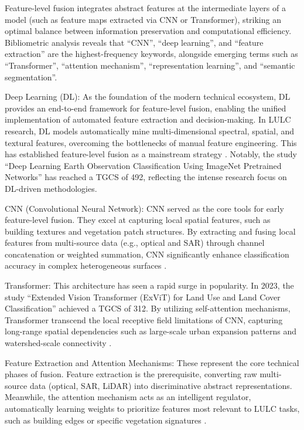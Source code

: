 \documentclass[]{interact}
\theoremstyle{plain}%
\theoremstyle{definition}
\theoremstyle{remark}
\begin{document}
Feature-level fusion integrates abstract features at the intermediate layers of a model (such as feature maps extracted via CNN or Transformer), striking an optimal balance between information preservation and computational efficiency. Bibliometric analysis reveals that ``CNN'', ``deep learning'', and ``feature extraction'' are the highest-frequency keywords, alongside emerging terms such as ``Transformer'', ``attention mechanism'', ``representation learning'', and ``semantic segmentation''.

Deep Learning (DL): As the foundation of the modern technical ecosystem, DL provides an end-to-end framework for feature-level fusion, enabling the unified implementation of automated feature extraction and decision-making. In LULC research, DL models automatically mine multi-dimensional spectral, spatial, and textural features, overcoming the bottlenecks of manual feature engineering. This has established feature-level fusion as a mainstream strategy \citep{42,43}. Notably, the study ``Deep Learning Earth Observation Classification Using ImageNet Pretrained Networks'' \citep{28} has reached a TGCS of 492, reflecting the intense research focus on DL-driven methodologies.

\medskip %
CNN (Convolutional Neural Network): CNN served as the core tools for early feature-level fusion. They excel at capturing local spatial features, such as building textures and vegetation patch structures. By extracting and fusing local features from multi-source data (e.g., optical and SAR) through channel concatenation or weighted summation, CNN significantly enhance classification accuracy in complex heterogeneous surfaces \citep{41}.

\medskip
Transformer: This architecture has seen a rapid surge in popularity. In 2023, the study ``Extended Vision Transformer (ExViT) for Land Use and Land Cover Classification'' \citep{36} achieved a TGCS of 312. By utilizing self-attention mechanisms, Transformer transcend the local receptive field limitations of CNN, capturing long-range spatial dependencies such as large-scale urban expansion patterns and watershed-scale connectivity \citep{45}.

\medskip
Feature Extraction and Attention Mechanisms: These represent the core technical phases of fusion. Feature extraction is the prerequisite, converting raw multi-source data (optical, SAR, LiDAR) into discriminative abstract representations. Meanwhile, the attention mechanism acts as an intelligent regulator, automatically learning weights to prioritize features most relevant to LULC tasks, such as building edges or specific vegetation signatures \citep{46,47}.
\end{document}

